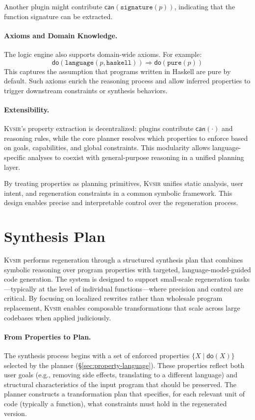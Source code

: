 \documentclass[sigplan]{acmart}
\newcommand{\sys}{{\scshape Kv{\textalpha}sir}\xspace}
\begin{document}
Another plugin might contribute $\mathsf{can}(\texttt{signature}(p))$, indicating that the function signature can be extracted.

\paragraph{Axioms and Domain Knowledge.}
The logic engine also supports domain-wide axioms. For example:
\[
\mathsf{do}(\texttt{language}(p, \texttt{haskell})) \Rightarrow \mathsf{do}(\texttt{pure}(p))
\]
This captures the assumption that programs written in Haskell are pure by default. Such axioms enrich the reasoning process and allow inferred properties to trigger downstream constraints or synthesis behaviors.

\paragraph{Extensibility.}
\sys’s property extraction is decentralized: plugins contribute $\mathsf{can}(\cdot)$ and reasoning rules, while the core planner resolves which properties to enforce based on goals, capabilities, and global constraints. This modularity allows language-specific analyses to coexist with general-purpose reasoning in a unified planning layer.

By treating properties as planning primitives, \sys unifies static analysis, user intent, and regeneration constraints in a common symbolic framework. This design enables precise and interpretable control over the regeneration process.

\section{Synthesis Plan}

\sys performs regeneration through a structured synthesis plan that combines symbolic reasoning over program properties with targeted, language-model-guided code generation. The system is designed to support small-scale regeneration tasks—typically at the level of individual functions—where precision and control are critical. By focusing on localized rewrites rather than wholesale program replacement, \sys enables composable transformations that scale across large codebases when applied judiciously.

\paragraph{From Properties to Plan.}
The synthesis process begins with a set of enforced properties $\{ X \mid \mathsf{do}(X) \}$ selected by the planner (§\ref{sec:property-language}). These properties reflect both user goals (e.g., removing side effects, translating to a different language) and structural characteristics of the input program that should be preserved. The planner constructs a transformation plan that specifies, for each relevant unit of code (typically a function), what constraints must hold in the regenerated version.
\end{document}

